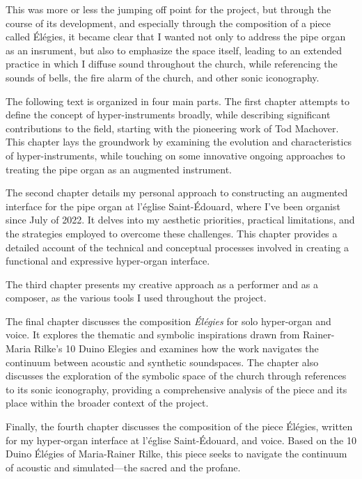 \documentclass[12pt,twoside,maitrise]{dms_ks}
\theoremstyle{definition}
\begin{document}
This was more or less the jumping off point for the project, but through the course of its development, and especially through the composition of a piece called Élégies, it became clear that I wanted not only to address the pipe organ as an insrument, but also to emphasize the space itself, leading to an extended practice in which I diffuse sound throughout the church, while referencing the sounds of bells, the fire alarm of the church, and other sonic iconography. 

The following text is organized in four main parts. 
The first chapter attempts to define the concept of hyper-instruments broadly, while describing significant contributions to the field, starting with the pioneering work of Tod Machover. 
This chapter lays the groundwork by examining the evolution and characteristics of hyper-instruments, while touching on some innovative ongoing approaches to treating the pipe organ as an augmented instrument.

The second chapter details my personal approach to constructing an augmented interface for the pipe organ at l’église Saint-Édouard, where I've been organist since July of 2022. 
It delves into my aesthetic priorities, practical limitations, and the strategies employed to overcome these challenges. 
This chapter provides a detailed account of the technical and conceptual processes involved in creating a functional and expressive hyper-organ interface.

The third chapter presents my creative approach as a performer and as a composer, as the various tools I used throughout the project. 

The final chapter discusses the composition \textit{Élégies} for solo hyper-organ and voice. 
It explores the thematic and symbolic inspirations drawn from Rainer-Maria Rilke's 10 Duino Elegies and examines how the work navigates the continuum between acoustic and synthetic soundspaces. 
The chapter also discusses the exploration of the symbolic space of the church through references to its sonic iconography, providing a comprehensive analysis of the piece and its place within the broader context of the project.

Finally, the fourth chapter discusses the composition of the piece Élégies, written for my hyper-organ interface at l’église Saint-Édouard, and voice. 
Based on the 10 Duino Élégies of Maria-Rainer Rilke, this piece seeks to navigate the continuum of acoustic and simulated---the sacred and the profane.

\end{document}
